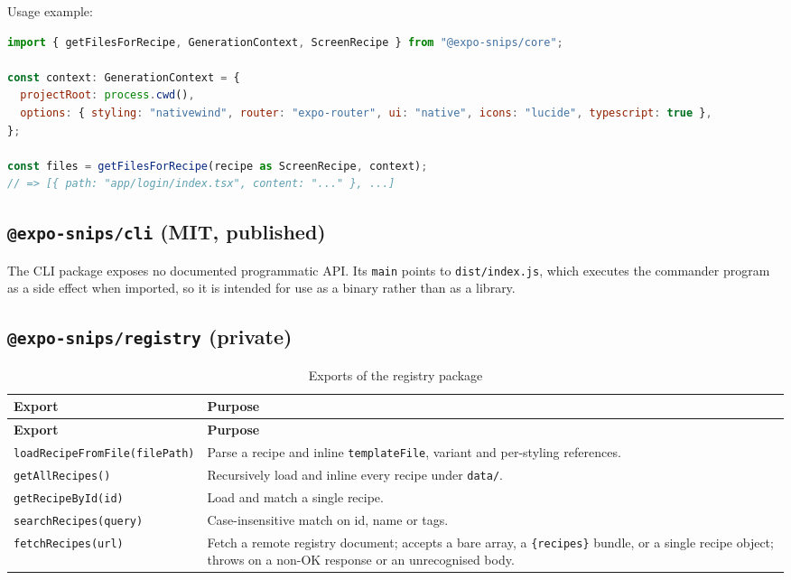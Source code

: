 Usage example:

\begin{lstlisting}[language=JavaScript]
import { getFilesForRecipe, GenerationContext, ScreenRecipe } from "@expo-snips/core";

const context: GenerationContext = {
  projectRoot: process.cwd(),
  options: { styling: "nativewind", router: "expo-router", ui: "native", icons: "lucide", typescript: true },
};

const files = getFilesForRecipe(recipe as ScreenRecipe, context);
// => [{ path: "app/login/index.tsx", content: "..." }, ...]
\end{lstlisting}

\subsection*{\texttt{@expo-snips/cli} (MIT, published)}

The CLI package exposes no documented programmatic API. Its
\texttt{main} points to \texttt{dist/index.js}, which executes the commander
program as a side effect when imported, so it is intended for use as a binary
rather than as a library.

\subsection*{\texttt{@expo-snips/registry} (private)}

\begin{longtable}{@{}L{6.4cm}L{7.8cm}@{}}
\caption{Exports of the registry package}\\
\toprule
\textbf{Export} & \textbf{Purpose} \\
\midrule
\endfirsthead
\toprule
\textbf{Export} & \textbf{Purpose} \\
\midrule
\endhead
\texttt{loadRecipeFromFile(filePath)} & Parse a recipe and inline \texttt{templateFile},
variant and per-styling references. \\
\texttt{getAllRecipes()} & Recursively load and inline every recipe under
\texttt{data/}. \\
\texttt{getRecipeById(id)} & Load and match a single recipe. \\
\texttt{searchRecipes(query)} & Case-insensitive match on id, name or tags. \\
\texttt{fetchRecipes(url)} & Fetch a remote registry document; accepts a bare array,
a \texttt{\{recipes\}} bundle, or a single recipe object; throws on a non-OK
response or an unrecognised body. \\
\bottomrule
\end{longtable}

